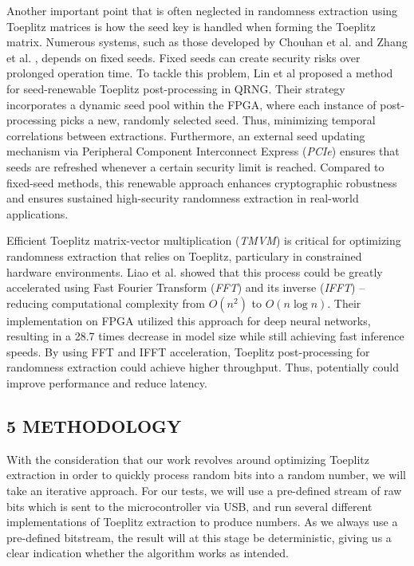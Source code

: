 Another important point that is often neglected in randomness extraction using Toeplitz matrices is how the seed key is handled when forming the Toeplitz matrix. Numerous systems, such as those developed by Chouhan et al. \cite{toeplitz-desc} and Zhang et al. \cite{toeplitz}, depends on fixed seeds. Fixed seeds can create security risks over prolonged operation time. To tackle this problem, Lin et al \cite{lin} proposed a method for seed-renewable Toeplitz post-processing in QRNG. Their strategy incorporates a dynamic seed pool within the FPGA, where each instance of post-processing picks a new, randomly selected seed. Thus, minimizing temporal correlations between extractions. Furthermore, an external seed updating mechanism via Peripheral Component Interconnect Express (\emph{PCIe}) ensures that seeds are refreshed whenever a certain security limit is reached. Compared to fixed-seed methods, this renewable approach enhances cryptographic robustness and ensures sustained high-security randomness extraction in real-world applications.

Efficient Toeplitz matrix-vector multiplication (\emph{TMVM}) is critical for optimizing randomness extraction that relies on Toeplitz, particulary in constrained hardware environments. Liao et al. \cite{liao} showed that this process could be greatly accelerated using Fast Fourier Transform (\emph{FFT}) and its inverse (\emph{IFFT}) -- reducing computational complexity from \(O(n^2)\) to \(O(n \log n)\). Their implementation on FPGA utilized this approach for deep neural networks, resulting in a 28.7 times decrease in model size while still achieving fast inference speeds. By using FFT and IFFT acceleration, Toeplitz post-processing for randomness extraction could achieve higher throughput. Thus, potentially could improve performance and reduce latency.

\subsection{5 METHODOLOGY}\label{methodology}

With the consideration that our work revolves around optimizing Toeplitz extraction in order to quickly process random bits into a random number, we will take an iterative approach. For our tests, we will use a pre-defined stream of raw bits which is sent to the microcontroller via USB, and run several different implementations of Toeplitz extraction to produce numbers. As we always use a pre-defined bitstream, the result will at this stage be deterministic, giving us a clear indication whether the algorithm works as intended.

